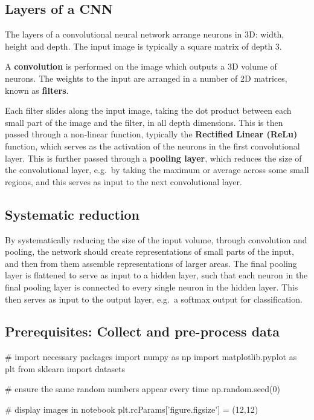 \documentclass[%
oneside,                 %
final,                   %
10pt]{article}
\begin{document}
\subsection{Layers of a CNN}
The layers of a convolutional neural network arrange neurons in 3D: width, height and depth.  
The input image is typically a square matrix of depth 3. 

A \textbf{convolution} is performed on the image which outputs
a 3D volume of neurons. The weights to the input are arranged in a number of 2D matrices, known as \textbf{filters}.


Each filter slides along the input image, taking the dot product
between each small part of the image and the filter, in all depth
dimensions. This is then passed through a non-linear function,
typically the \textbf{Rectified Linear (ReLu)} function, which serves as the
activation of the neurons in the first convolutional layer. This is
further passed through a \textbf{pooling layer}, which reduces the size of the
convolutional layer, e.g.~by taking the maximum or average across some
small regions, and this serves as input to the next convolutional
layer.


\subsection{Systematic reduction}

By systematically reducing the size of the input volume, through
convolution and pooling, the network should create representations of
small parts of the input, and then from them assemble representations
of larger areas.  The final pooling layer is flattened to serve as
input to a hidden layer, such that each neuron in the final pooling
layer is connected to every single neuron in the hidden layer. This
then serves as input to the output layer, e.g.~a softmax output for
classification.


\subsection{Prerequisites: Collect and pre-process data}
\bpycod
# import necessary packages
import numpy as np
import matplotlib.pyplot as plt
from sklearn import datasets


# ensure the same random numbers appear every time
np.random.seed(0)

# display images in notebook
plt.rcParams['figure.figsize'] = (12,12)
\end{document}
